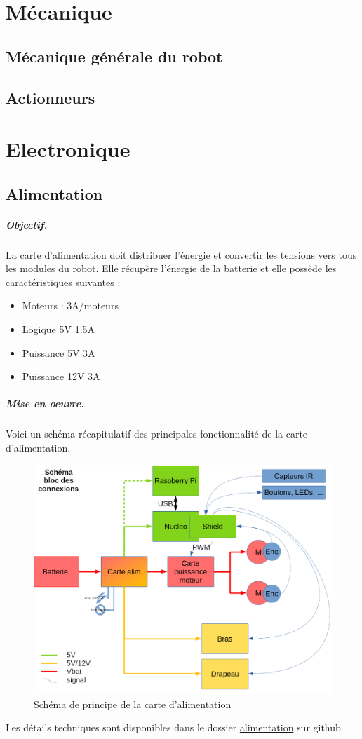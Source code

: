 \documentclass[a4paper,10pt]{report}
\begin{document}
\begin{spacing}{1.5}
\chapter{Mécanique}
\section{Mécanique générale du robot}
\section{Actionneurs}

\chapter{Electronique}
\section{Alimentation}
\paragraph{Objectif.} La carte d'alimentation doit distribuer l'énergie et
convertir les tensions vers tous les modules du robot. Elle récupère l'énergie
de la batterie et elle possède les caractéristiques suivantes :
\begin{itemize}
\item Moteurs : 3A/moteurs
\item Logique 5V 1.5A
\item Puissance 5V 3A
\item Puissance 12V 3A
\end{itemize}
\paragraph{Mise en oeuvre.} Voici un schéma récapitulatif des principales fonctionnalité de la carte d'alimentation.
\begin{figure}[H]
  \center
  \includegraphics[scale=0.4]{schema_bloc_connexions.png}
  \caption{Schéma de principe de la carte d'alimentation}
\end{figure}
Les détails techniques sont disponibles dans le dossier
\href{https://github.com/eirbot/eirbot2020-1A/tree/master/alim}{alimentation}
sur github.

\end{spacing}
\end{document}
